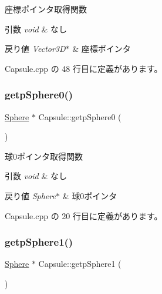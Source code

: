 座標ポインタ取得関数 


\begin{DoxyParams}{引数}
{\em void} & なし \\
\hline
\end{DoxyParams}

\begin{DoxyRetVals}{戻り値}
{\em Vector3\+D$\ast$} & 座標ポインタ \\
\hline
\end{DoxyRetVals}


 Capsule.\+cpp の 48 行目に定義があります。

\mbox{\label{class_capsule_ad6590760125ad1b564bcd00fc9c0272e}} 
\subsubsection{\texorpdfstring{getp\+Sphere0()}{getpSphere0()}}
{\footnotesize\ttfamily \mbox{\hyperlink{class_sphere}{Sphere}} $\ast$ Capsule\+::getp\+Sphere0 (\begin{DoxyParamCaption}{ }\end{DoxyParamCaption})}



球0ポインタ取得関数 


\begin{DoxyParams}{引数}
{\em void} & なし \\
\hline
\end{DoxyParams}

\begin{DoxyRetVals}{戻り値}
{\em Sphere$\ast$} & 球0ポインタ \\
\hline
\end{DoxyRetVals}


 Capsule.\+cpp の 20 行目に定義があります。

\mbox{\label{class_capsule_a3abd8375914c3ae6c5ff8ad585988d57}} 
\subsubsection{\texorpdfstring{getp\+Sphere1()}{getpSphere1()}}
{\footnotesize\ttfamily \mbox{\hyperlink{class_sphere}{Sphere}} $\ast$ Capsule\+::getp\+Sphere1 (\begin{DoxyParamCaption}{ }\end{DoxyParamCaption})}



